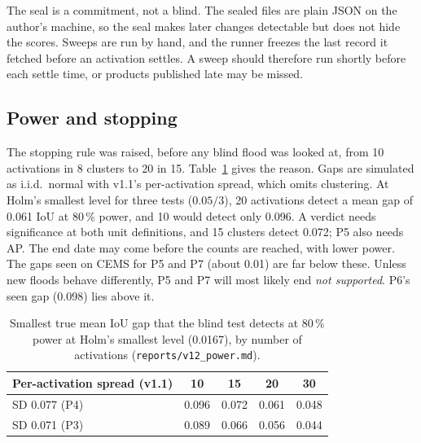 \documentclass[10pt,twocolumn,a4paper]{article}
\newcommand{\file}[1]{\nolinkurl{#1}}
\newcommand{\pp}{\,\%}
\begin{document}
The seal is a commitment, not a blind. The sealed files are plain JSON on the author's machine, so the seal makes
later changes detectable but does not hide the scores. Sweeps are run by hand, and the runner freezes the last record
it fetched before an activation settles. A sweep should therefore run shortly before each settle time, or products
published late may be missed.

\subsection{Power and stopping}
The stopping rule was raised, before any blind flood was looked at, from 10 activations in 8 clusters to 20 in 15.
Table~\ref{tab:power} gives the reason. Gaps are simulated as i.i.d.\ normal with v1.1's per-activation spread, which
omits clustering. At Holm's smallest level for three tests ($0.05/3$), 20 activations detect a mean gap of 0.061 IoU
at 80\pp{} power, and 10 would detect only 0.096. A verdict needs significance at both unit definitions, and 15
clusters detect 0.072; P5 also needs AP. The end date may come before the counts are reached, with lower power.
The gaps seen on CEMS for P5 and P7 (about 0.01) are far below these.
Unless new floods behave differently, P5 and P7 will most likely end \emph{not supported}. P6's seen gap (0.098) lies
above it.

\begin{table}[t]
\centering\small
\caption{Smallest true mean IoU gap that the blind test detects at 80\pp{} power at Holm's smallest level (0.0167), by
number of activations (\file{reports/v12_power.md}).}
\label{tab:power}
\setlength{\tabcolsep}{4pt}
\begin{tabular}{@{}l c c c c@{}}
\toprule
Per-activation spread (v1.1) & 10 & 15 & 20 & 30 \\
\midrule
SD 0.077 (P4) & 0.096 & 0.072 & 0.061 & 0.048 \\
SD 0.071 (P3) & 0.089 & 0.066 & 0.056 & 0.044 \\
\bottomrule
\end{tabular}
\end{table}
\end{document}

